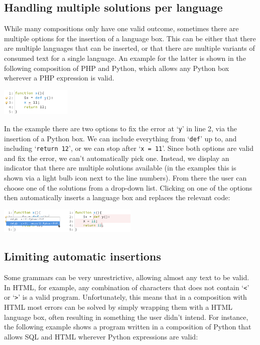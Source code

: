 \documentclass[sigplan,screen]{acmart}\settopmatter{printfolios=true,printccs=false,printacmref=false}
\newcommand{\qtt}[1]{`\texttt{#1}'\xspace}
\begin{document}
\subsection{Handling multiple solutions per language}

While many compositions only have one valid outcome, sometimes there are
multiple options for the insertion of a language box. This can be either that
there are multiple languages that can be inserted, or that there are multiple
variants of consumed text for a single language.  An example for the latter is
shown in the following composition of PHP and Python, which allows any Python
box wherever a PHP expression is valid.

\begin{center}
\includegraphics[width=0.25\textwidth]{images/autoboxmultioption.png}
\end{center}

In the example there are two options to fix the error at \qtt{y} in line 2, via
the insertion of a Python box. We can include everything from \qtt{def} up to,
and including \qtt{return 12}, or we can stop after \qtt{x = 11}.  Since both
options are valid and fix the error, we can't automatically pick one.
Instead, we display an indicator that there are multiple solutions available
(in the examples this is shown via a light bulb icon next to the line numbers). From
there the user can choose one of the solutions from a drop-down list. Clicking
on one of the options then automatically inserts a language box and replaces
the relevant code:

\begin{center}
\includegraphics[width=0.50\textwidth]{images/autoboxmultioption2.png}
\end{center}

\subsection{Limiting automatic insertions}
\label{subsec:limitingautoinserts}

Some grammars can be very unrestrictive, allowing almost any text to be valid.
In HTML, for example, any combination of characters that does not contain
\qtt{<} or \qtt{>} is a valid program. Unfortunately, this means that in a
composition with HTML most errors can be solved by simply wrapping them with a
HTML language box, often resulting in something the user didn't intend. For
instance, the following example shows a program written in a composition of
Python that allows SQL and HTML wherever Python expressions are valid:
\end{document}
